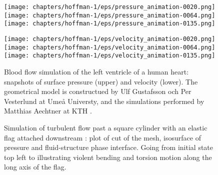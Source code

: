 \begin{figure}[bhpt]

\centerline{
\texttt{[image: chapters/hoffman-1/eps/pressure\_animation-0020.png]}
\texttt{[image: chapters/hoffman-1/eps/pressure\_animation-0064.png]}
\texttt{[image: chapters/hoffman-1/eps/pressure\_animation-0135.png]}
}

\centerline{
\texttt{[image: chapters/hoffman-1/eps/velocity\_animation-0020.png]}
\texttt{[image: chapters/hoffman-1/eps/velocity\_animation-0064.png]}
\texttt{[image: chapters/hoffman-1/eps/velocity\_animation-0135.png]}
}
\caption{Blood flow simulation of the left ventricle of a human heart: snapshots of surface pressure (upper) and velocity (lower).
The geometrical model is constructued by Ulf Gustafsson och Per Vesterlund at Ume{\aa} Universty, and the simulations
performed by Matthias Aechtner at KTH \cite{Aechtner2009}.}
\label{fig:heart}
\end{figure}


\begin{figure}[!h]
\caption{
Simulation of turbulent flow past a square cylinder with an elastic
flag attached downstream \cite{HoffmanJanssonEtAl2009}: plot of cut of
the mesh, isosurface of pressure and fluid-structure phase
interface. Going from initial state top left to illustrating violent
bending and torsion motion along the long axis of the flag.  }
\label{fig:flag}
\end{figure}
